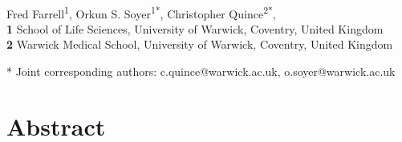 \documentclass[10pt,letterpaper]{article}
\date{}
\begin{document}
\vspace*{0.2in}

\begin{flushleft}
{\Large
\textbf{}
}
\newline
\\
Fred Farrell\textsuperscript{1},
Orkun S. Soyer\textsuperscript{1*},
Christopher Quince\textsuperscript{2*},
\\
\bigskip
\textbf{1} School of Life Sciences, University of Warwick, Coventry, United Kingdom
\\\textbf{2} Warwick Medical School, University of Warwick, Coventry, United Kingdom
\\
\bigskip

% 
%





* Joint corresponding authors: c.quince@warwick.ac.uk, o.soyer@warwick.ac.uk

\end{flushleft}
\section*{Abstract}
\end{document}
